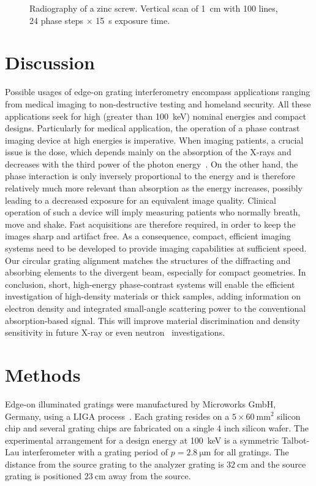 \begin{figure}[hbt]
    \centering
    
    \caption[Radiography of a zinc screw.]{Radiography of a zinc screw.
        Vertical scan of \SI{1}{\centi\metre} with \num{100} lines,
        \num{24} phase steps $\times$ \SI{15}{\second} exposure time.}
    \label{fig:screw}
\end{figure}

\section{Discussion}
Possible usages of edge-on grating interferometry encompass applications
ranging from medical imaging to non-destructive testing and homeland
security. All these applications seek for high (greater than
\SI{100}{\kilo\eV}) nominal energies
and compact designs. Particularly for medical application, the operation of
a phase contrast imaging device at high energies is imperative. When imaging
patients, a crucial issue is the dose, which depends mainly on the
absorption of the X-rays and decreases with the third power of the photon
energy~\cite{Momose2005}. On the other hand, the phase interaction is only inversely
proportional to the energy and is therefore relatively much more relevant
than absorption as the energy increases, possibly leading to a decreased
exposure for an equivalent image quality. Clinical operation of such a
device will imply measuring patients who normally breath, move and shake.
Fast acquisitions are therefore required, in order to keep the images sharp
and artifact free. As a consequence, compact, efficient imaging systems need
to be developed to provide imaging capabilities at sufficient speed. Our
circular grating alignment matches the structures of the diffracting and
absorbing elements to the divergent beam, especially for compact geometries.
In conclusion, short, high-energy phase-contrast systems will enable the
efficient investigation of high-density materials or thick samples, adding
information on electron density and integrated small-angle scattering power
to the conventional absorption-based signal. This will improve material
discrimination and density sensitivity in future X-ray or even
neutron~\cite{Grunzweig2008} investigations.

\section{Methods}
Edge-on illuminated gratings were manufactured by Microworks GmbH, Germany, using a LIGA process~\cite{Kenntner2010}. Each grating
resides on a $5 \times \SI{60}{\milli\metre^2}$ silicon chip and several
grating chips are fabricated on a single 4 inch silicon wafer. The
experimental arrangement for a design energy at \SI{100}{\kilo\electronvolt}
is a symmetric Talbot-Lau interferometer with a grating period of $p =
\SI{2.8}{\micro \metre}$ for all gratings. The distance from the source
grating to the analyzer grating is $\SI{32}{\centi\metre}$ and the source
grating is positioned $\SI{23}{\centi\metre}$ away from the source.

